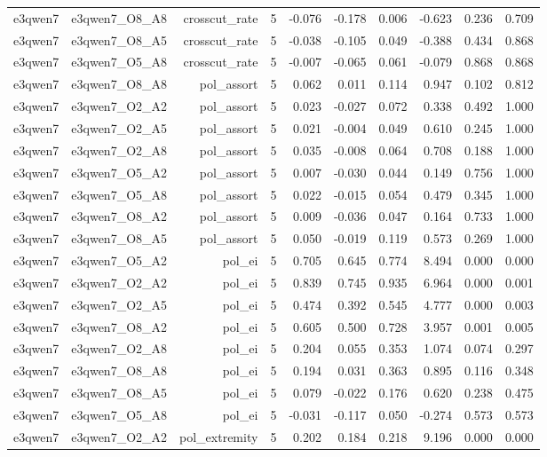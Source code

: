 \documentclass[11pt]{article}
\begin{document}
\begin{landscape}
\begin{longtable}{@{}lrrrrrrrrr@{}}
e3qwen7 & e3qwen7\_O8\_A8 & crosscut\_rate & 5 & -0.076 & -0.178 & 0.006 & -0.623 & 0.236 & 0.709 \\
e3qwen7 & e3qwen7\_O8\_A5 & crosscut\_rate & 5 & -0.038 & -0.105 & 0.049 & -0.388 & 0.434 & 0.868 \\
e3qwen7 & e3qwen7\_O5\_A8 & crosscut\_rate & 5 & -0.007 & -0.065 & 0.061 & -0.079 & 0.868 & 0.868 \\
e3qwen7 & e3qwen7\_O8\_A8 & pol\_assort & 5 & 0.062 & 0.011 & 0.114 & 0.947 & 0.102 & 0.812 \\
e3qwen7 & e3qwen7\_O2\_A2 & pol\_assort & 5 & 0.023 & -0.027 & 0.072 & 0.338 & 0.492 & 1.000 \\
e3qwen7 & e3qwen7\_O2\_A5 & pol\_assort & 5 & 0.021 & -0.004 & 0.049 & 0.610 & 0.245 & 1.000 \\
e3qwen7 & e3qwen7\_O2\_A8 & pol\_assort & 5 & 0.035 & -0.008 & 0.064 & 0.708 & 0.188 & 1.000 \\
e3qwen7 & e3qwen7\_O5\_A2 & pol\_assort & 5 & 0.007 & -0.030 & 0.044 & 0.149 & 0.756 & 1.000 \\
e3qwen7 & e3qwen7\_O5\_A8 & pol\_assort & 5 & 0.022 & -0.015 & 0.054 & 0.479 & 0.345 & 1.000 \\
e3qwen7 & e3qwen7\_O8\_A2 & pol\_assort & 5 & 0.009 & -0.036 & 0.047 & 0.164 & 0.733 & 1.000 \\
e3qwen7 & e3qwen7\_O8\_A5 & pol\_assort & 5 & 0.050 & -0.019 & 0.119 & 0.573 & 0.269 & 1.000 \\
e3qwen7 & e3qwen7\_O5\_A2 & pol\_ei & 5 & 0.705 & 0.645 & 0.774 & 8.494 & 0.000 & 0.000 \\
e3qwen7 & e3qwen7\_O2\_A2 & pol\_ei & 5 & 0.839 & 0.745 & 0.935 & 6.964 & 0.000 & 0.001 \\
e3qwen7 & e3qwen7\_O2\_A5 & pol\_ei & 5 & 0.474 & 0.392 & 0.545 & 4.777 & 0.000 & 0.003 \\
e3qwen7 & e3qwen7\_O8\_A2 & pol\_ei & 5 & 0.605 & 0.500 & 0.728 & 3.957 & 0.001 & 0.005 \\
e3qwen7 & e3qwen7\_O2\_A8 & pol\_ei & 5 & 0.204 & 0.055 & 0.353 & 1.074 & 0.074 & 0.297 \\
e3qwen7 & e3qwen7\_O8\_A8 & pol\_ei & 5 & 0.194 & 0.031 & 0.363 & 0.895 & 0.116 & 0.348 \\
e3qwen7 & e3qwen7\_O8\_A5 & pol\_ei & 5 & 0.079 & -0.022 & 0.176 & 0.620 & 0.238 & 0.475 \\
e3qwen7 & e3qwen7\_O5\_A8 & pol\_ei & 5 & -0.031 & -0.117 & 0.050 & -0.274 & 0.573 & 0.573 \\
e3qwen7 & e3qwen7\_O2\_A2 & pol\_extremity & 5 & 0.202 & 0.184 & 0.218 & 9.196 & 0.000 & 0.000 \\

\end{longtable}
\end{landscape}
\end{document}
